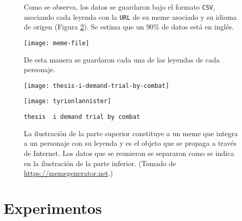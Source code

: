 \begin{figure}[h]
  \centering
  \begin{minipage}[l]{\linewidth}
  \end{minipage}
  \caption{
    Como se observa, los datos se guardaron bajo el formato \texttt{CSV}, asociando cada leyenda con la \texttt{URL}
    de su meme asociado y su idioma de origen (Figura \ref{meme-file}). Se estima que un $90\%$ de datos está en inglés.
  }
  \label{file-hierarchy}
\end{figure}

\begin{figure}[H]
  \centering
  \texttt{[image: meme-file]}
  \caption{
    De esta manera se guardaron cada una de las leyendas de cada personaje.
  }
  \label{meme-file}
\end{figure}

\begin{figure}
  \centering
  \begin{minipage}[l]{\linewidth}
    \texttt{[image: thesis-i-demand-trial-by-combat]}
  \end{minipage}\hfill
  \begin{minipage}[r]{0.5\linewidth}
    \texttt{[image: tyrionlannister]}
  \end{minipage}\hfill
  \begin{minipage}[r]{0.5\linewidth}
    \verb+thesis  i demand trial by combat+
  \end{minipage}
  \caption{
    La ilustración de la parte superior constituye a un meme que integra a un personaje con su leyenda y
    es el objeto que se propaga a través de Internet. Los datos que se reunieron se separaron como se
    indica en la ilustración de la parte inferior.
    (Tomado de \url{https://memegenerator.net}.)
  }
  \label{meme-separation}
\end{figure}

\section{Experimentos}

